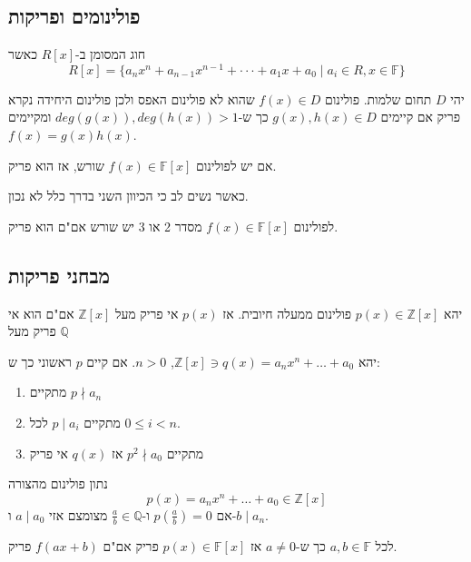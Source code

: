 \documentclass{tstextbook}
\begin{document}
\subsection{פולינומים ופריקות}

\begin{definition}
חוג המסומן ב-\(R[x]\) כאשר 
$$R[x]=\{a_{n}x^{n}+a_{n-1}x^{n-1}+\cdot\cdot\cdot+a_{1}x+a_{0}\mid a_{i}\in R, x \in \mathbb{F} \} $$

\end{definition}
\begin{definition}
יהי \(D\) תחום שלמות. פולינום \(f(x)\in D\) שהוא לא פולינום האפס ולכן פולינום היחידה נקרא פריק אם קיימים \(g(x),h(x)\in D\) כך ש-\(deg(g(x)),deg(h(x))>1\) ומקיימים \(f(x)=g(x)h(x)\).

\end{definition}
\begin{proposition}
אם יש לפולינום \(f(x)\in \mathbb{F}[x]\) שורש, אז הוא פריק. 

\end{proposition}
כאשר נשים לב כי הכיוון השני בדרך כלל לא נכון.

\begin{proposition}
לפולינום \(f(x)\in \mathbb{F}[x]\) מסדר 2 או 3 יש שורש אם"ם הוא פריק.

\end{proposition}
\subsection{מבחני פריקות}

\begin{proposition}
יהא \(p(x)\in \mathbb{Z}[x]\) פולינום ממעלה חיובית. אז \(p(x)\) אי פריק מעל \(\mathbb{Z}[x]\) אם"ם הוא אי פריק מעל \(\mathbb{Q}\)

\end{proposition}
\begin{proposition}
יהא \(\mathbb{Z}[x]\ni q(x)=a_{n}x^n+\dots+a_{0}\), \(n>0\).
אם קיים \(p\) ראשוני כך ש:

  \begin{enumerate}
    \item מתקיים \(p\nmid a_n\)


    \item מתקיים \(p\mid a_{i}\) לכל \(0\leq i<n\). 


    \item מתקיים \(p^2 \nmid a_{0}\) 
אז \(q(x)\) אי פריק


  \end{enumerate}
\end{proposition}
\begin{proposition}
נתון פולינום מהצורה $$p(x)=a_{n}x^{n}+\ldots+a_{0}\in\mathbb{Z}[x]$$ אם \(p\left( \frac{a}{b} \right)=0\) ו-\(\frac{a}{b}\in \mathbb{ Q}\) מצומצם אזי \(a\mid a_{0}\) ו-\(b\mid a_{n}\).

\end{proposition}
\begin{proposition}
לכל \(a,b \in \mathbb{F}\) כך ש-\(a\neq 0\) אז \(p(x) \in \mathbb{F} [x]\) פריק אם"ם \(f(ax+b)\) פריק.

\end{proposition}
\end{document}
